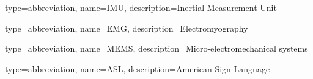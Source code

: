 
{
    type=abbreviation,
    name=IMU,
    description={Inertial Measurement Unit}
} 
 
 
{
    type=abbreviation,
    name=EMG,
    description={Electromyography}
}

{
    type=abbreviation,
    name=MEMS,
    description={Micro-electromechanical systems}
}

{
    type=abbreviation,
    name=ASL,
    description={American Sign Language}
}
